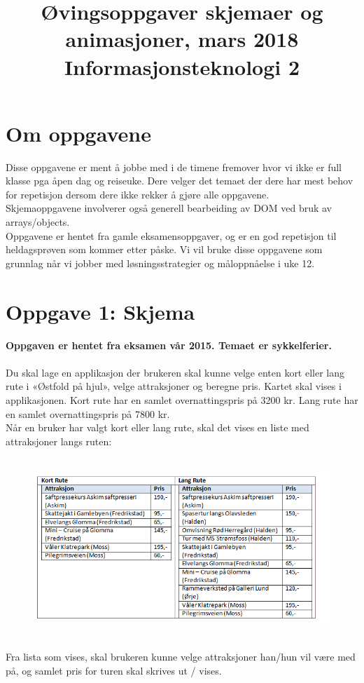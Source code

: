 \documentclass[a4paper, norsk, 10pt]{article}
\title{\bfseries \huge Øvingsoppgaver skjemaer og animasjoner, mars 2018 \\ Informasjonsteknologi 2}
\date{}
\author{}
\begin{document}
\thispagestyle{fancy}
\maketitle

\section*{Om oppgavene}
Disse oppgavene er ment å jobbe med i de timene fremover hvor vi ikke er full klasse pga åpen dag og reiseuke. Dere velger det temaet der dere har mest behov for repetisjon dersom dere ikke rekker å gjøre alle oppgavene. \\
Skjemaoppgavene involverer også generell bearbeiding av DOM ved bruk av arrays/objects.\\
Oppgavene er hentet fra gamle eksamensoppgaver, og er en god repetisjon til heldagsprøven som kommer etter påske. Vi vil bruke disse oppgavene som grunnlag når vi jobber med løsningsstrategier og måloppnåelse i uke 12. \\

\section*{Oppgave 1: Skjema}
\textbf{Oppgaven er hentet fra eksamen vår 2015. Temaet er sykkelferier.}\\
\ \\
Du skal lage en applikasjon der brukeren skal kunne velge enten kort eller lang rute i «Østfold på hjul», velge attraksjoner og beregne pris. Kartet skal vises i applikasjonen.
Kort rute har en samlet overnattingspris på 3200 kr. Lang rute har en samlet overnattingspris på 7800 kr.\\
Når en bruker har valgt kort eller lang rute, skal det vises en liste med attraksjoner langs ruten: \\
\ \\
\begin{figure}[h!]
\includegraphics[width=12cm]{v15.png}
\end{figure}
\ \\
Fra lista som vises, skal brukeren kunne velge attraksjoner han/hun vil være med på, og samlet pris for turen skal skrives ut / vises.\\
\end{document}
